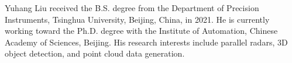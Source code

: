 \documentclass[lettersize,journal]{IEEEtran}
\begin{document}
\begin{IEEEbiography}{Yuhang Liu}
  received the B.S. degree from the Department of Precision Instruments, Tsinghua University, Beijing, China, in 2021. He is currently working toward the Ph.D. degree with the Institute of Automation, Chinese Academy of Sciences, Beijing. His research interests include parallel radars, 3D object detection, and point cloud data generation.
\end{IEEEbiography}

\vspace{-33pt}
\end{document}
